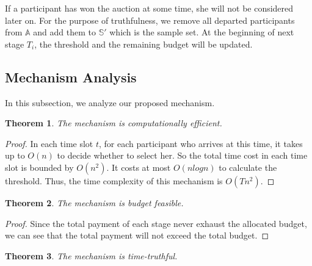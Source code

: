 \documentclass[10pt,journal,letterpaper,compsoc]{IEEEtran}
\newtheorem{theorem}{Theorem}
\begin{document}
If a participant has won the auction at some time, she will not be considered later on. For the purpose of truthfulness, we remove all departed participants from $\mathbb{A}$ and add them to $\mathbb{S}'$ which is the sample set. At the beginning of next stage $T_i$, the threshold and the remaining budget will be updated.

\subsection{Mechanism Analysis}

In this subsection, we analyze our proposed mechanism.

\begin{theorem}
The mechanism is computationally efficient.
\end{theorem}

\begin{proof}
In each time slot $t$, for each participant who arrives at this time, it takes up to $O(n)$ to decide whether to select her. So the total time cost in each time slot is bounded by $O(n^2)$. It costs at most $O(nlogn)$ to calculate the threshold. Thus, the time complexity of this mechanism is $O(Tn^2)$.
\end{proof}

\begin{theorem}
The mechanism is budget feasible.
\end{theorem}

\begin{proof}
Since the total payment of each stage never exhaust the allocated budget, we can see that the total payment will not exceed the total budget.
\end{proof}

\begin{theorem}
The mechanism is time-truthful.
\end{theorem}
\end{document}
